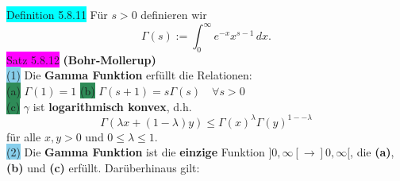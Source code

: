\documentclass[landscape, 10pt]{article}
\begin{document}
\begin{multicols}{3}
              \colorbox{cyan}{Definition 5.8.11} 
                     Für \textcolor{NavyBlue}{$s>0$} 
                     definieren wir 
                     \begin{equation*}
                            \Gamma(s):=\int_0^\infty 
                     e^{-x}x^{s-1}\,dx.
                     \end{equation*}
              \colorbox{magenta}{Satz 5.8.12} 
              \textbf{(Bohr-Mollerup)} \\
                     \colorbox{SkyBlue}{(1)} 
                            Die \textbf{Gamma Funktion} 
                            erfüllt die Relationen:\\ 
                            \colorbox{SeaGreen}{(a)}
                                   \textcolor{NavyBlue}{
                                   $\Gamma(1)=1$} \qquad
                            \colorbox{SeaGreen}{(b)} 
                                   \textcolor{NavyBlue}{
                                   $\Gamma(s+1)=s\Gamma(s)
                                   \quad\forall s>0$} \\
                            \colorbox{SeaGreen}{(c)} 
                                   \textcolor{NavyBlue}{
                                   $\gamma$} ist 
                                   \textbf{logarithmisch 
                                   konvex}, d.h.
                                   \begin{equation*}
                                          \Gamma(\lambda x+(1-\lambda)y)
                                          \leqslant\Gamma(x)^\lambda
                                          \Gamma(y)^{1--\lambda}
                                   \end{equation*}
                                   für alle 
                                   \textcolor{NavyBlue}{
                                   $x,y>0$} und 
                                   \textcolor{NavyBlue}{
                                   $0\leqslant\lambda
                                   \leqslant1$}.\\
                     \colorbox{SkyBlue}{(2)} 
                            Die \textbf{Gamma Funktion} ist die 
                            \textbf{einzige} Funktion 
                            \textcolor{NavyBlue}{
                            $]0,\infty[\longrightarrow]0,
                            \infty[$},
                            die \textbf{(a)}, 
                            \textbf{(b)} und \textbf{(c)} 
                            erfüllt. Darüberhinaus gilt: 

\end{multicols}
\end{document}
